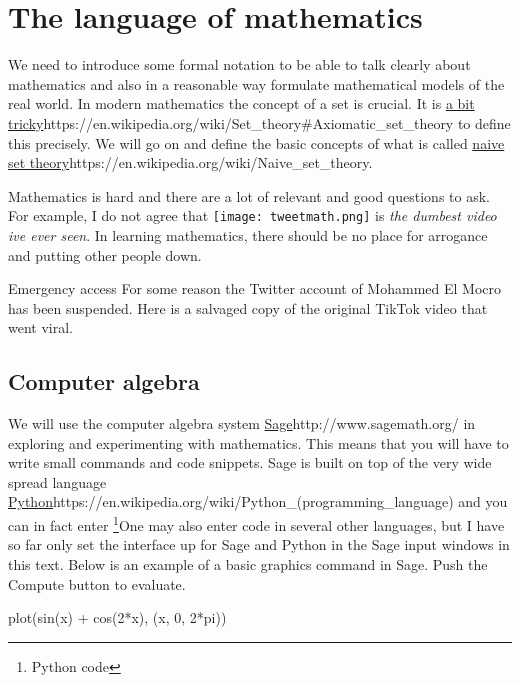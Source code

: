 \documentclass{article}
\begin{document}

\chapter{The language of mathematics}

We need to introduce some formal notation to be able to talk clearly about mathematics and also in a reasonable way 
formulate mathematical models of the real world. In modern mathematics the 
concept of a set is crucial. It is \url{a bit tricky}{https://en.wikipedia.org/wiki/Set_theory\#Axiomatic_set_theory} to define this precisely.
We will go on and define the basic concepts of what is called 
\url{naive set theory}{https://en.wikipedia.org/wiki/Naive_set_theory}.

Mathematics is hard and there are a lot of relevant and good questions
to ask. For example, I do not agree that
\texttt{[image: tweetmath.png]}
is \emph{the dumbest video ive ever seen}. In learning mathematics,
there should be no place for arrogance and putting other people down.

\begin{hideinbutton}{Emergency access}
  For some reason the Twitter account of Mohammed El Mocro %
  has been suspended. Here is a salvaged copy of the original TikTok video that went viral.


\end{hideinbutton}

\section{Computer algebra}

We will use the computer algebra system
\url{Sage}{http://www.sagemath.org/} in exploring and experimenting
with mathematics. This means that you will have to write small
commands and code snippets. Sage is built on top of the very wide
spread language
\url{Python}{https://en.wikipedia.org/wiki/Python_(programming_language)}
and you can in fact enter \footnote{Python code}{One may also enter code in several other languages, but I have so far only set the interface up for Sage and Python} in
the Sage input windows in this text. Below is an example of a basic
graphics command in Sage.  Push the Compute button to evaluate.


\begin{sage}
plot(sin(x) + cos(2*x), (x, 0, 2*pi))
\end{sage}
\end{document}
